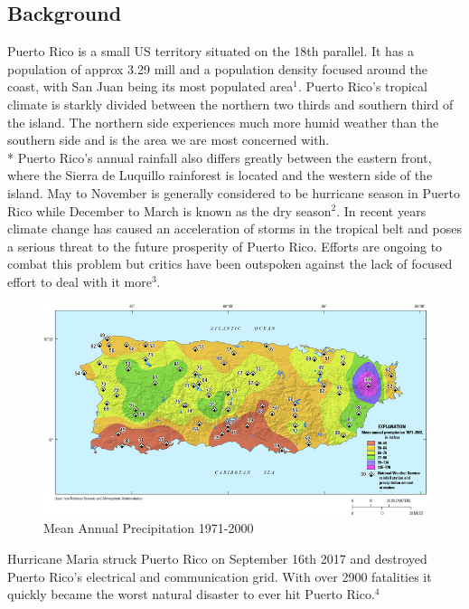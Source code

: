 \documentclass[a4paper,12pt]{article}
\begin{document}
\subsection{Background}
Puerto Rico is a small US territory situated on the 18th parallel. It has a population of approx 3.29 mill and a population density focused around the coast,
with San Juan being its most populated area$^{1}$. Puerto Rico's tropical climate is starkly divided between the northern two thirds and southern third of the island.
The northern side experiences much more humid weather than the southern side and is the area we are most concerned with.\\* Puerto Rico's annual rainfall also differs greatly between the eastern front, where the Sierra de Luquillo rainforest is located and the western side of the island.
May to November is generally considered to be hurricane season in Puerto Rico while December to March is known as the dry season$^{2}$.
In recent years climate change has caused an acceleration of storms in the tropical belt and poses a serious threat to the future prosperity of Puerto Rico. Efforts are ongoing to combat this problem but critics have been outspoken against the lack
of focused effort to deal with it more$^{3}$.

\begin{figure}[h]
\centering
\includegraphics[scale =0.5]{Rainfall}
\caption{Mean Annual Precipitation 1971-2000}
\label{rainfall}
\end{figure}

Hurricane Maria struck Puerto Rico on September 16th 2017 and destroyed Puerto Rico's electrical and communication grid. With over 2900 fatalities it quickly became
the worst natural disaster to ever hit Puerto Rico.$^4$
\end{document}

